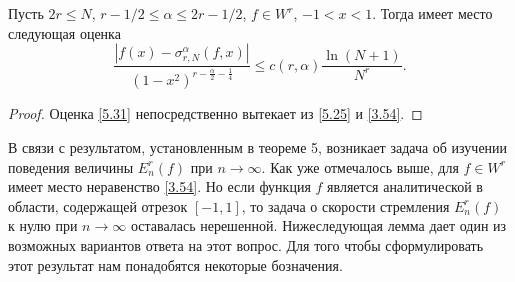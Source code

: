 
\begin{corollary} Пусть $2r\le N$, $r-1/2\le \alpha\le 2r-1/2$, $f\in W^r$, $-1<x<1$. Тогда имеет место следующая оценка
\begin{equation}\label{5.31}
 \frac{|f(x)-\sigma_{r,N}^\alpha(f,x)|}
{(1-x^2)^{r-\frac{\alpha}{2}-\frac14}}\le c(r,\alpha)\frac{\ln(N+1)}{N^r}.
 \end{equation}
\end{corollary}

\begin{proof}
Оценка \eqref{5.31} непосредственно вытекает из \eqref{5.25} и \eqref{3.54}.
\end{proof}

В связи с результатом, установленным в теореме 5, возникает задача об изучении поведения величины $E_{n}^r(f)$ при $n\to\infty$. Как уже отмечалось выше, для $f\in W^r$ имеет место неравенство \eqref{3.54}. Но если функция $f$ является аналитической в области, содержащей отрезок $[-1,1]$, то задача о скорости стремления $E_{n}^r(f)$ к нулю при $n\to\infty$ оставалась нерешенной. Нижеследующая лемма дает один из возможных вариантов ответа на этот вопрос. Для того чтобы сформулировать этот результат нам понадобятся некоторые бозначения.

